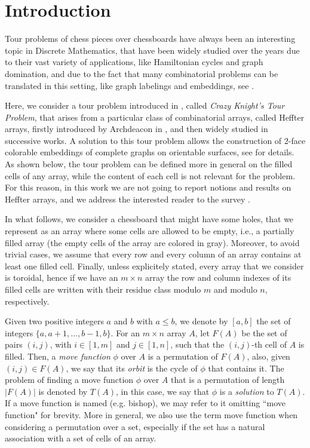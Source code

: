 \documentclass{amsart}
\theoremstyle{definition}
\numberwithin{equation}{section}
\begin{document}
\section{Introduction}
Tour problems of chess pieces over chessboards have always been an interesting topic in Discrete Mathematics, that have been widely studied over the years due to their vast variety of applications, like Hamiltonian cycles and graph domination, and due to the fact that many combinatorial problems can be translated in this setting, like graph labelings and embeddings, see \cite{W}. 


Here, we consider a tour problem introduced in \cite{CDP}, called \textit{Crazy Knight's Tour Problem}, that arises from a particular class of combinatorial arrays, called Heffter arrays, firstly introduced by Archdeacon in \cite{A}, and then widely studied in successive works. A solution to this tour problem allows the construction of $2$-face colorable embeddings of complete graphs on orientable surfaces, see \cite{CDP} for details. As shown below, the tour problem can be defined more in general on the filled cells  of any array, while the content of each cell is not relevant for the problem.  For this reason, in this work we are not going to report notions and results on Heffter arrays, and we address the interested reader to the survey \cite{PD23}. 
 

In what follows, we consider a chessboard that might have some holes, that we represent as an array where some cells are allowed to be empty, i.e., a partially filled array (the empty cells of the array are colored in gray). Moreover, to avoid trivial cases, we assume that every row and every column of an array contains at least one filled cell. Finally, unless explicitely stated, every array that we consider is toroidal, hence if we have an $m \times n$ array the row and column  indexes of its filled cells are written with their residue class modulo $m$ and modulo $n$, respectively. 

Given two positive integers $a$ and $b$ with $a\leq b$, we denote by $[a,b]$ the set of integers $\{a, a+1, \dotsc, b-1, b\}$. For an $m \times n$ array $A$, let $F(A)$ be the set of pairs $(i,j)$, with $i \in [1,m]$ and $j \in [1,n]$, such that the $(i,j)$-th cell of $A$ is filled. Then, a \textit{move function} $\phi$ over $A$ is a permutation of $F(A)$, also, 
given $(i,j) \in F(A)$, we say that its \textit{orbit} is the cycle of $\phi$ that contains it. The problem of finding a move function $\phi$ over $A$ that is a permutation of length $|F(A)|$ is denoted by $T(A)$, in this case, we say that $\phi$ is a \textit{solution} to $T(A)$.
If a move function is named (e.g. bishop), we may refer to it omitting ``move function" for brevity.
More in general, we also use the term move function when considering a permutation over a set, especially if the set has a natural association with a set of cells of an array.
\end{document}
